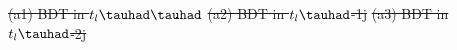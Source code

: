 \documentclass[PAPER, coverpage, atlasdraft=true, texlive=2016, UKenglish]{\ATLASLATEXPATH atlasdoc}
\providecommand{\DIFdel}[1]{{\protect\color{red}\sout{#1}}}                      %
\providecommand{\DIFdelbegin}{} %
\providecommand{\DIFdelFL}[1]{\DIFdel{#1}} %
\begin{document}
\DIFdelbegin %
\DIFdelFL{(a1) BDT in $t_l\thadhad$ }%
\DIFdelFL{(a2) BDT in  $t_l\tauhad$-1j}%
\DIFdelFL{(a3) BDT in $t_l\tauhad$-2j}%
\end{document}
